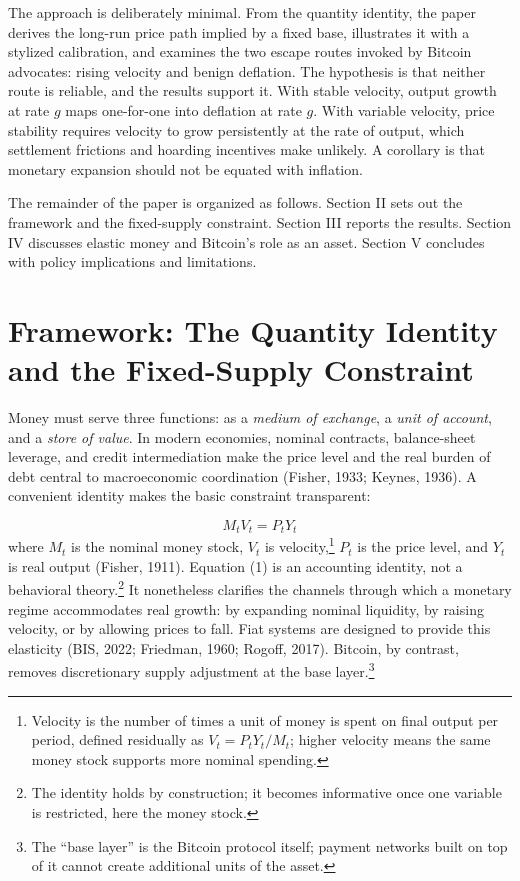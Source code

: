 \documentclass[12pt]{article}
\begin{document}
The approach is deliberately minimal. From the quantity identity, the paper derives the long-run price path implied by a fixed base, illustrates it with a stylized calibration, and examines the two escape routes invoked by Bitcoin advocates: rising velocity and benign deflation. The hypothesis is that neither route is reliable, and the results support it. With stable velocity, output growth at rate $g$ maps one-for-one into deflation at rate $g$. With variable velocity, price stability requires velocity to grow persistently at the rate of output, which settlement frictions and hoarding incentives make unlikely. A corollary is that monetary expansion should not be equated with inflation.

The remainder of the paper is organized as follows. Section II sets out the framework and the fixed-supply constraint. Section III reports the results. Section IV discusses elastic money and Bitcoin's role as an asset. Section V concludes with policy implications and limitations.

\section{Framework: The Quantity Identity and the Fixed-Supply Constraint}

Money must serve three functions: as a \emph{medium of exchange}, a \emph{unit of account}, and a \emph{store of value}. In modern economies, nominal contracts, balance-sheet leverage, and credit intermediation make the price level and the real burden of debt central to macroeconomic coordination (Fisher, 1933; Keynes, 1936). A convenient identity makes the basic constraint transparent:

\begin{equation}
M_{t} V_{t} = P_{t} Y_{t}
\end{equation}
\noindent where $M_{t}$ is the nominal money stock, $V_{t}$ is velocity,\footnote{Velocity is the number of times a unit of money is spent on final output per period, defined residually as $V_{t} = P_{t}Y_{t}/M_{t}$; higher velocity means the same money stock supports more nominal spending.} $P_{t}$ is the price level, and $Y_{t}$ is real output (Fisher, 1911). Equation (1) is an accounting identity, not a behavioral theory.\footnote{The identity holds by construction; it becomes informative once one variable is restricted, here the money stock.} It nonetheless clarifies the channels through which a monetary regime accommodates real growth: by expanding nominal liquidity, by raising velocity, or by allowing prices to fall. Fiat systems are designed to provide this elasticity (BIS, 2022; Friedman, 1960; Rogoff, 2017). Bitcoin, by contrast, removes discretionary supply adjustment at the base layer.\footnote{The ``base layer'' is the Bitcoin protocol itself; payment networks built on top of it cannot create additional units of the asset.}
\end{document}
